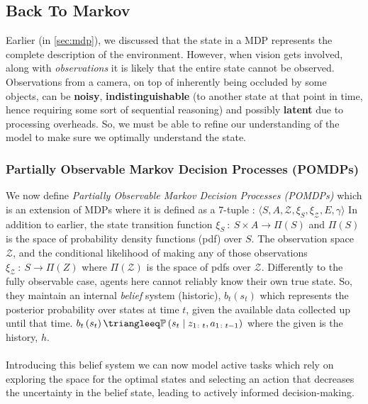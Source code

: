   \subsection{Back To Markov}
  Earlier (in \ref{sec:mdp}), we discussed that the state in a MDP represents the complete description of the environment. However, when vision gets involved, along with \emph{observations} it is likely that the entire state cannot be observed. Observations from a camera, on top of inherently being occluded by some objects, can be \textbf{noisy}, \textbf{indistinguishable} (to another state at that point in time, hence requiring some sort of sequential reasoning) and possibly \textbf{latent} due to processing overheads. So, we must be able to refine our understanding of the model to make sure we optimally understand the state.

  \subsubsection{Partially Observable Markov Decision
  Processes (POMDPs)}\label{sec:pomdp}
  We now define \emph{Partially Observable Markov Decision Processes (POMDPs)} 
  which is an extension of MDPs where it is defined as a 7-tuple \cite{thrun2002probabilistic,placed2023surveyactivesimultaneouslocalization}: \(\langle S, A, \mathcal{Z}, \xi_S, \xi_{\mathcal{Z}}, E, \gamma \rangle \) In addition to earlier, the state transition function \( \xi_S ~\colon~ S \times A \rightarrow \Pi\left(S\right)\) and $\Pi\left(S\right)$ is the space of probability density functions (pdf) over $S$. The observation space $\mathcal{Z}$, and the conditional likelihood of making any of those observations \(\xi_{\mathcal{Z}} ~\colon~ S \rightarrow \Pi\left(Z\right)\) where $\Pi\left(\mathcal{Z}\right)$ is the space of pdfs over $\mathcal{Z}$.
  Differently to the fully observable case, agents here cannot reliably know their own true state. So, they maintain an internal \emph{belief} system (historic), $b_t\left(s_t\right)$ which represents the posterior probability over states at time $t$, given the available data collected up until that time. \(b_t\left(s_t\right) \triangleeq  \mathbb{P}\left(s_t \mid z_{1 \colon t}, a_{1 \colon t - 1}\right)\) where the given is the history, $h$.
  \\\\
  Introducing this belief system we can now model active tasks which rely on exploring the space for the optimal states and selecting an action that decreases the uncertainty in the belief state, leading to actively informed decision-making.

